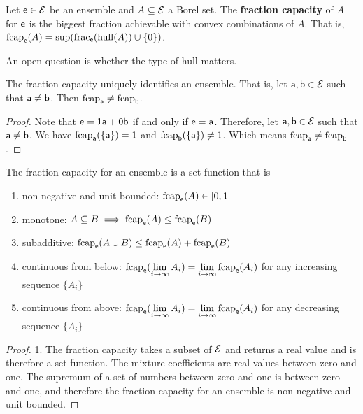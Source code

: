 \begin{mathSection}
	\begin{defn}
		Let $\ens \in \Ens$ be an ensemble and $A \subseteq \Ens$ a Borel set. The \textbf{fraction capacity} of $A$ for $\ens$ is the biggest fraction achievable with convex combinations of $A$. That is, $\fcap_{\ens}(A) = \sup(\size_{\ens}(\hull(A))\cup\{0\})$.
	\end{defn}
	
	\begin{remark}
		An open question is whether the type of hull matters.
	\end{remark}

	\begin{coro}
		The fraction capacity uniquely identifies an ensemble. That is, let $\ens[a], \ens[b] \in \Ens$ such that $\ens[a] \neq \ens[b]$. Then $\fcap_{\ens[a]} \neq \fcap_{\ens[b]}$.
	\end{coro}
	
	\begin{proof}
		Note that $\ens = 1 \ens[a] + 0 \ens[b]$ if and only if $\ens = \ens[a]$. Therefore, let $\ens[a], \ens[b] \in \Ens$ such that $\ens[a] \neq \ens[b]$. We have $\fcap_{\ens[a]}(\{\ens[a]\}) = 1$ and $\fcap_{\ens[b]}(\{\ens[a]\}) \neq 1$. Which means $\fcap_{\ens[a]} \neq \fcap_{\ens[b]}$.
	\end{proof}
	
	\begin{prop}
		The fraction capacity for an ensemble is a set function that is
		\begin{enumerate}
			\item non-negative and unit bounded: $\fcap_{\ens}(A) \in [0,1]$
			\item monotone: $A \subseteq B \implies \fcap_{\ens}(A) \leq \fcap_{\ens}(B)$
			\item subadditive: $\fcap_{\ens}(A \cup B) \leq \fcap_{\ens}(A) + \fcap_{\ens}(B)$
			\item continuous from below: $\fcap_{\ens}(\lim\limits_{i \to \infty} A_i) = \lim\limits_{i \to \infty} \fcap_{\ens}(A_i)$ for any increasing sequence $\{A_i\}$
			\item continuous from above: $\fcap_{\ens}(\lim\limits_{i \to \infty} A_i) = \lim\limits_{i \to \infty} \fcap_{\ens}(A_i)$ for any decreasing sequence $\{A_i\}$
		\end{enumerate}
	\end{prop}
	
	\begin{proof}
		1. The fraction capacity takes a subset of $\Ens$ and returns a real value and is therefore a set function. The mixture coefficients are real values between zero and one. The supremum of a set of numbers between zero and one is between zero and one, and therefore the fraction capacity for an ensemble is non-negative and unit bounded.
		

\end{proof}
\end{mathSection}
